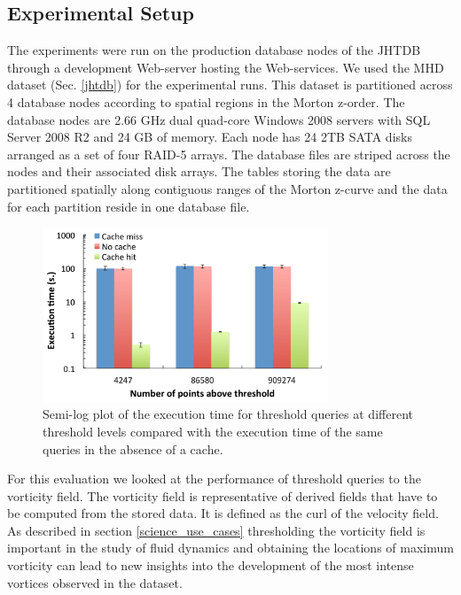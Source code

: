 \documentclass{sig-alternate}
\begin{document}
\subsection{Experimental Setup}
The experiments were run on the production database nodes of the JHTDB through a development Web-server hosting the Web-services. We used
the MHD dataset (Sec. \ref{jhtdb}) for the experimental runs. This dataset is partitioned across 4 database nodes according to spatial regions in the
Morton z-order. 
The database nodes are 2.66 GHz dual quad-core Windows 2008 servers with SQL Server 2008 R2 and 24 GB of memory. Each node has 24 2TB 
SATA disks arranged as a set of four RAID-5 arrays. The database files are striped across the nodes and their associated disk
arrays. The tables storing the data are partitioned spatially along contiguous ranges of the Morton z-curve and the data for each partition reside in one
database file. 

\begin{figure}
\centering
\includegraphics[width=3.35in]{Figures/cache_overhead.pdf}
\caption{Semi-log plot of the execution time for threshold queries at different threshold levels compared with the execution time of the same queries in the
absence of a cache.}
\label{fig:cache_overhead}
\end{figure}

For this evaluation we looked at the performance of threshold queries to the vorticity field. The vorticity field is representative of derived fields that
have to be computed from the stored data. It is defined as the curl of the velocity field.
As described in section \ref{science_use_cases}
thresholding the vorticity field is important in the study of fluid dynamics and obtaining the locations of maximum vorticity can lead to new insights into
the development of the most intense vortices observed in the dataset. 
\end{document}
